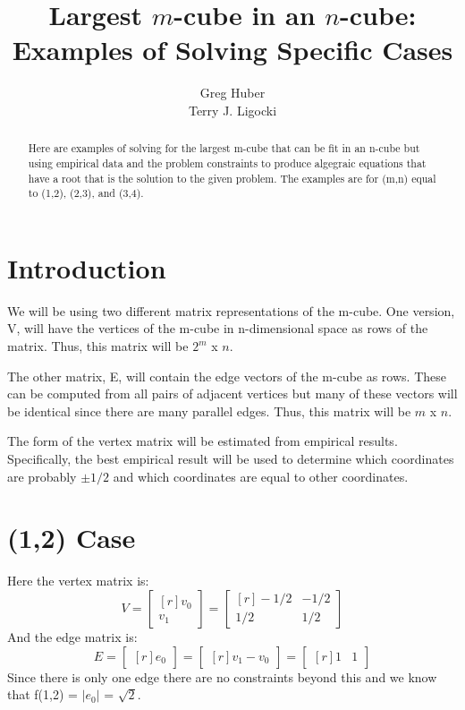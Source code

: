 \documentclass[12pt,titlepage]{article}
\title{\bf Largest $m$-cube in an $n$-cube: \\
       Examples of Solving Specific Cases
      }
\author{Greg Huber \\
        Terry J. Ligocki
       }
\begin{document}
\maketitle

\begin{abstract}
Here are examples of solving for the largest m-cube that can be fit in an
n-cube but using empirical data and the problem constraints to produce
algegraic equations that have a root that is the solution to the given
problem.  The examples are for (m,n) equal to (1,2), (2,3), and (3,4).
\end{abstract}

\section{Introduction}

We will be using two different matrix representations of the m-cube.  One
version, V, will have the vertices of the m-cube in n-dimensional space as
rows of the matrix.  Thus, this matrix will be $2^m$ x $n$.

The other matrix, E, will contain the edge vectors of the m-cube as rows.
These can be computed from all pairs of adjacent vertices but many of these
vectors will be identical since there are many parallel edges.  Thus, this
matrix will be $m$ x $n$.

The form of the vertex matrix will be estimated from empirical results.
Specifically, the best empirical result will be used to determine which
coordinates are probably $\pm 1/2$ and which coordinates are equal to other
coordinates.

\section{(1,2) Case}

Here the vertex matrix is:
\begin{equation*}
V =
\begin{bmatrix*}[r]
v_0 \\
v_1
\end{bmatrix*}
=
\begin{bmatrix*}[r]
-1/2 & -1/2  \\
 1/2 &  1/2 
\end{bmatrix*}
\end{equation*}
And the edge matrix is:
\begin{equation*}
E =
\begin{bmatrix*}[r]
e_0
\end{bmatrix*}
=
\begin{bmatrix*}[r]
v_1 - v_0
\end{bmatrix*}
=
\begin{bmatrix*}[r]
 1 & 1
\end{bmatrix*}
\end{equation*}
Since there is only one edge there are no constraints beyond this and we know
that f(1,2) = $|e_0|$ = $\sqrt{2}$.
\end{document}
